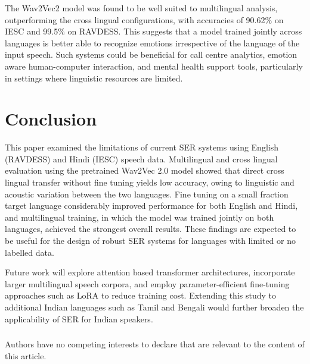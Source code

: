 \documentclass[runningheads]{llncs}
\begin{document}
The Wav2Vec2 model was found to be well suited to multilingual analysis, outperforming the cross lingual configurations, with accuracies of 90.62\% on IESC and 99.5\% on RAVDESS. This suggests that a model trained jointly across languages is better able to recognize emotions irrespective of the language of the input speech. Such systems could be beneficial for call centre analytics, emotion aware human-computer interaction, and mental health support tools, particularly in settings where linguistic resources are limited.


\section{Conclusion}
\label{sec:conclusion}

This paper examined the limitations of current SER systems using English (RAVDESS) and Hindi (IESC) speech data. Multilingual and cross lingual evaluation using the pretrained Wav2Vec 2.0 model showed that direct cross lingual transfer without fine tuning yields low accuracy, owing to linguistic and acoustic variation between the two languages. Fine tuning on a small fraction target language considerably improved performance for both English and Hindi, and multilingual training, in which the model was trained jointly on both languages, achieved the strongest overall results. These findings are expected to be useful for the design of robust SER systems for languages with limited or no labelled data.

Future work will explore attention based transformer architectures, incorporate larger multilingual speech corpora, and employ parameter-efficient fine-tuning approaches such as LoRA to reduce training cost. Extending this study to additional Indian languages such as Tamil and Bengali would further broaden the applicability of SER for Indian speakers.

\begin{credits}
\subsubsection{\discintname}
Authors have no competing interests to declare that are relevant to the content of this article.
\end{credits}
\end{document}
